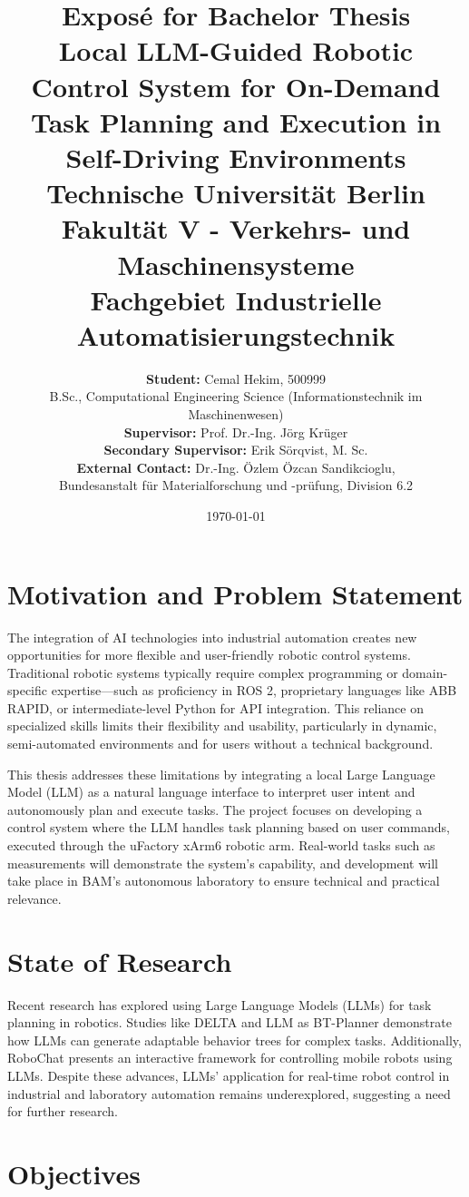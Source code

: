 \documentclass[a4paper,11pt]{article}
\title{Exposé for Bachelor Thesis\\
\vspace{0.5em}
\large \textbf{Local LLM-Guided Robotic Control System for On-Demand Task Planning and Execution in Self-Driving Environments}\\
\vspace{2em}
\small
Technische Universität Berlin \\
Fakultät V - Verkehrs- und Maschinensysteme\\
Fachgebiet Industrielle Automatisierungstechnik
}
\author{
\textbf{Student:} Cemal Hekim, 500999 \\
B.Sc., Computational Engineering Science (Informationstechnik im Maschinenwesen) \vspace{1em} \\
\textbf{Supervisor:} Prof. Dr.-Ing. Jörg Krüger \\
\textbf{Secondary Supervisor:} Erik Sörqvist, M. Sc. \vspace{1em} \\
\textbf{External Contact:} Dr.-Ing. Özlem Özcan Sandikcioglu, \\ 
Bundesanstalt für Materialforschung und -prüfung, Division 6.2
}
\date{\today}
\begin{document}
\maketitle

\section{Motivation and Problem Statement}

The integration of AI technologies into industrial automation creates new opportunities for more flexible and user-friendly robotic control systems. Traditional robotic systems typically require complex programming or domain-specific expertise—such as proficiency in ROS 2, proprietary languages like ABB RAPID, or intermediate-level Python for API integration. This reliance on specialized skills limits their flexibility and usability, particularly in dynamic, semi-automated environments and for users without a technical background.

This thesis addresses these limitations by integrating a local Large Language Model (LLM) as a natural language interface to interpret user intent and autonomously plan and execute tasks. The project focuses on developing a control system where the LLM handles task planning based on user commands, executed through the uFactory xArm6 robotic arm. Real-world tasks such as measurements will demonstrate the system’s capability, and development will take place in BAM’s autonomous laboratory to ensure technical and practical relevance.

\section{State of Research}

Recent research has explored using Large Language Models (LLMs) for task planning in robotics. Studies like DELTA \cite{liu2024delta} and LLM as BT-Planner \cite{ao2024llm} demonstrate how LLMs can generate adaptable behavior trees for complex tasks. Additionally, RoboChat \cite{10489289} presents an interactive framework for controlling mobile robots using LLMs. Despite these advances, LLMs' application for real-time robot control in industrial and laboratory automation remains underexplored, suggesting a need for further research.

\newpage

\section{Objectives}
\end{document}
